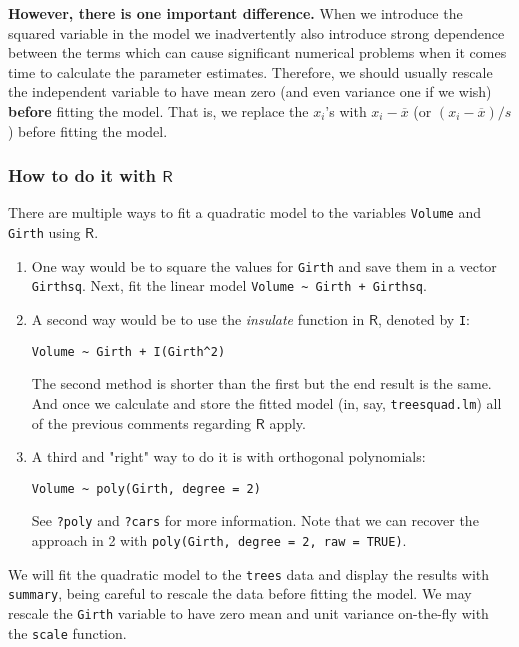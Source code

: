 \textbf{However, there is one important difference.} When we introduce the
squared variable in the model we inadvertently also introduce strong
dependence between the terms which can cause significant numerical
problems when it comes time to calculate the parameter
estimates. Therefore, we should usually rescale the independent
variable to have mean zero (and even variance one if we wish) \textbf{before}
fitting the model. That is, we replace the \(x_{i}\)'s with
\(x_{i}-\overline{x}\) (or \((x_{i}-\overline{x})/s\)) before fitting
the model.

\subsubsection{How to do it with \(\mathsf{R}\)}
\label{sec-12-4-1-1}

There are multiple ways to fit a quadratic model to the variables
\texttt{Volume} and \texttt{Girth} using \(\mathsf{R}\).
\begin{enumerate}
\item One way would be to square the values for \texttt{Girth} and save them in
a vector \texttt{Girthsq}. Next, fit the linear model \texttt{Volume \textasciitilde{} Girth +
   Girthsq}.
\item A second way would be to use the \emph{insulate} function in
\(\mathsf{R}\), denoted by \texttt{I}:
\begin{verbatim}
Volume ~ Girth + I(Girth^2)
\end{verbatim}
The second method is shorter than the first but the end result is
the same. And once we calculate and store the fitted model (in,
say, \texttt{treesquad.lm}) all of the previous comments regarding
\(\mathsf{R}\) apply.
\item A third and "right" way to do it is with orthogonal polynomials:
\begin{verbatim}
Volume ~ poly(Girth, degree = 2)
\end{verbatim}
See \texttt{?poly} and \texttt{?cars} for more information. Note that we can
recover the approach in 2 with \texttt{poly(Girth, degree = 2, raw =
   TRUE)}.
\end{enumerate}


We will fit the quadratic model to the \texttt{trees} data and display the
results with \texttt{summary}, being careful to rescale the data before
fitting the model. We may rescale the \texttt{Girth} variable to have zero
mean and unit variance on-the-fly with the \texttt{scale} function.

